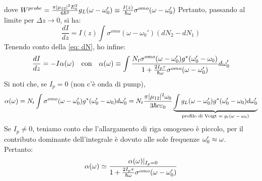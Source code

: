 dove $W^{probe} = \frac{\pi |\*\mu_{12}|^2 E_0^2}{6 \hbar^2} g_L(\omega - \omega_0') \equiv \frac{I(z)}{\hbar \omega} \sigma^{omo}(\omega - \omega_0')$
Pertanto, passando al limite per $\Delta z \rightarrow 0$, si ha:
\begin{equation*}
\frac{dI}{dz} = I(z) \int \sigma^{omo}(\omega -\omega_0') (dN_2 - dN_1)
\end{equation*}
Tenendo conto della \eqref{eq: dN}, ho infine:
\begin{equation*}
\frac{dI}{dz} = -I \alpha(\omega) \quad \text{con} \quad \alpha(\omega) \equiv \int \frac{N_t \sigma^{omo}(\omega - \omega_0') g^*(\omega_0' - \omega_0)}{1 + \frac{2 I_p \tau}{\hbar \omega} \sigma^{omo}(\omega - \omega_0')} d\omega_0'
\end{equation*}
Si noti che, se $I_p = 0$ (non c'è onda di pump),
\begin{equation*}
\alpha(\w) = N_t \int \sigma^{omo}(\omega - \omega_0') g^*(\omega_0' - \omega_0) d\omega_0' = N_t \frac{\pi |\*\mu_{12}|^2 \omega_0}{3 \hbar c \varepsilon_0} \underbrace{\int g_L(\omega - \omega_0') g^*(\omega_0' - \omega_0) d\omega_0'}_\text{profilo di Voigt $= g_t(\omega - \omega_0)$}
\end{equation*}
Se $I_p \neq 0$, teniamo conto che l'allargamento di riga omogeneo è piccolo, per il contributo dominante dell'integrale è dovuto alle sole frequenze $\omega_0' \approx \omega$.\\
Pertanto:
\begin{equation*}
\alpha(\omega) \simeq \frac{\alpha(\omega)|_{I_p = 0}}{1 + \frac{2 I_p \tau}{\hbar \omega} \sigma^{omo}(\omega - \omega_0')}
\end{equation*}

